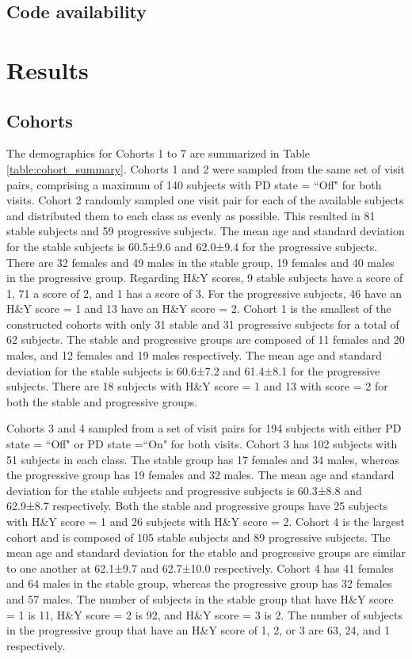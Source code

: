 \documentclass[10pt,letterpaper]{article}
\begin{document}
\subsection*{Code availability}

\section*{Results}

\subsection*{Cohorts}

The demographics for Cohorts 1 to 7 are summarized in Table \ref{table:cohort_summary}. Cohorts 1 and 2 were sampled from the same set of visit pairs, comprising a 
maximum of 140 subjects with PD state = ``Off" for both visits. Cohort 2 randomly sampled one visit pair for each of the available subjects and 
distributed them to each class as evenly as possible. This resulted in 81 stable subjects and 59 progressive subjects. The mean age and standard deviation for the stable subjects 
is 60.5±9.6 and 62.0±9.4 for the progressive subjects. There are 32 females and 49 males in the stable group, 19 females and 40 males in the progressive group. 
Regarding H\&Y scores, 9 stable subjects have a score of 1, 71 a score of 2, and 1 has a score of 3. For the progressive subjects, 46 have an H\&Y 
score = 1 and 13 have an H\&Y score = 2. Cohort 1 is the smallest of the constructed cohorts with only 31 stable and 31 progressive subjects for a total of 62 
subjects. The stable and progressive groups are composed of 11 females and 20 males, and 12 females and 19 males respectively. The mean age and standard deviation for the stable 
subjects is 60.6±7.2 and 61.4±8.1 for the progressive subjects. There are 18 subjects with H\&Y score = 1 and 13 with score = 2 for both the stable and progressive 
groups.

Cohorts 3 and 4 sampled from a set of visit pairs for 194 subjects with either PD state = ``Off" or PD state =``On" for both visits. Cohort 3 has 102 subjects with 
51 subjects in each class. The stable group has 17 females and 34 males, whereas the progressive group has 19 females and 32 males. The mean age and standard deviation for the stable 
subjects and progressive subjects is 60.3±8.8 and 62.9±8.7 respectively. Both the stable and progressive groups have 25 subjects with H\&Y score = 1 and 26 subjects 
with H\&Y score = 2. Cohort 4 is the largest cohort and is composed of 105 stable subjects and 89 progressive subjects. The mean age and standard deviation for the 
stable and progressive groups are similar to one another at 62.1±9.7 and 62.7±10.0 respectively. Cohort 4 has 41 females and 64 males in the stable group, whereas the 
progressive group has 32 females and 57 males. The number of subjects in the stable group that have H\&Y score = 1 is 11, H\&Y score = 2 is 92, and H\&Y score = 3 is 2. 
The number of subjects in the progressive group that have an H\&Y score of 1, 2, or 3 are 63, 24, and 1 respectively.
\end{document}
